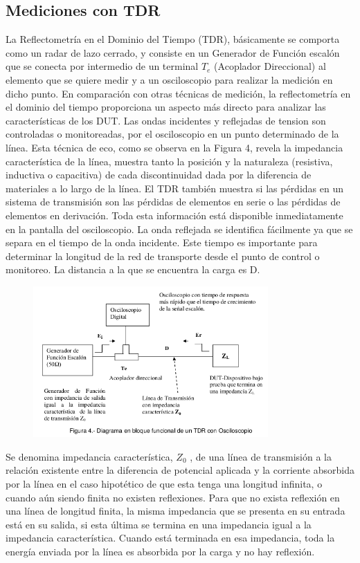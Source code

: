 \documentclass[a4paper,12pt,twoside]{article}
\begin{document}
\subsection{Mediciones con TDR}

La Reflectometría en el Dominio del Tiempo (TDR), básicamente se comporta como un
radar de lazo cerrado, y consiste en un Generador de Función escalón que se conecta
por intermedio de un terminal $T_e$ (Acoplador Direccional) al
elemento que se quiere medir y a un osciloscopio para realizar la medición en dicho
punto.
En comparación con otras técnicas de medición, la reflectometría en el dominio del tiempo
proporciona un aspecto más directo para analizar las características de los DUT. Las
ondas incidentes y reflejadas de tension son controladas o monitoreadas, por el
osciloscopio en un punto determinado de la línea.
Esta técnica de eco, como se observa en la Figura 4, revela la impedancia característica
de la línea, muestra tanto la posición y la naturaleza (resistiva, inductiva o capacitiva) de
cada discontinuidad dada por la diferencia de materiales a lo largo de la línea. El TDR
también muestra si las pérdidas en un sistema de transmisión son las pérdidas de
elementos en serie o las pérdidas de elementos en derivación. Toda esta información
está disponible inmediatamente en la pantalla del osciloscopio.
La onda reflejada se identifica fácilmente ya que se separa en el tiempo de la onda incidente.
Este tiempo es importante para determinar la longitud de la red de transporte desde el punto de control o monitoreo. La distancia a la
que se encuentra la carga es D.
\begin{figure}[H]
    \centering
    \includegraphics[width=0.8\textwidth]{../img/tdr.png}
\end{figure}
Se denomina impedancia característica, $Z_0$ , de una línea de transmisión a la relación existente entre la
diferencia de potencial aplicada y la corriente absorbida por la línea en el caso hipotético de que esta
tenga una longitud infinita, o cuando aún siendo finita no existen reflexiones. Para que no exista
reflexión en una línea de longitud finita, la misma impedancia que se presenta en su entrada
está en su salida, si esta última se termina en una impedancia igual a la impedancia
característica. Cuando está terminada en esa impedancia, toda la energía enviada por la línea
es absorbida por la carga y no hay reflexión.
\end{document}
